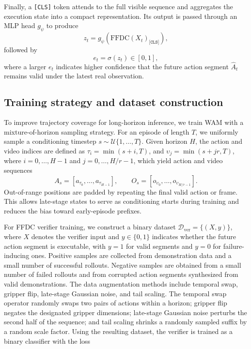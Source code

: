 \documentclass{article}
\begin{document}
Finally, a \texttt{[CLS]} token attends to the full visible sequence and aggregates the execution state into a compact representation. Its output is passed through an MLP head \(g_{\psi}\) to produce
\begin{equation}
z_t = g_{\psi}\!\left(\mathrm{FFDC}(X_t)_{\texttt{[CLS]}}\right),
\end{equation}
followed by
\begin{equation}
e_t = \sigma(z_t) \in [0,1],
\end{equation}
where a larger \(e_t\) indicates higher confidence that the future action segment \(\hat{A}_t\) remains valid under the latest real observation.

\subsection{Training strategy and dataset construction}
\label{sec:training strategy}
To improve trajectory coverage for long-horizon inference, we train WAM with a mixture-of-horizon sampling strategy. For an episode of length \(T\), we uniformly sample a conditioning timestep \(s \sim \mathcal{U}\{1,\dots,T\}\). Given horizon \(H\), the action and video indices are defined as \(\tau_i=\min(s+i,T)\), and \(\upsilon_j=\min(s+jr,T)\), where \(i=0,\dots,H-1\) and \(j=0,\dots,H/r-1\), which yield action and video sequences
\begin{equation}
A_s=[a_{\tau_0},\dots,a_{\tau_{H-1}}], \qquad
O_s=[o_{\upsilon_0},\dots,o_{\upsilon_{H/r-1}}].
\end{equation}
Out-of-range positions are padded by repeating the final valid action or frame. This allows late-stage states to serve as conditioning starts during training and reduces the bias toward early-episode prefixes.

For FFDC verifier training, we construct a binary dataset \(\mathcal{D}_{\mathrm{ver}}=\{(X,y)\}\), where \(X\) denotes the verifier input and \(y \in \{0,1\}\) indicates whether the future action segment is executable, with \(y=1\) for valid segments and \(y=0\) for failure-inducing ones. Positive samples are collected from demonstration data and a small number of successful rollouts. Negative samples are obtained from a small number of failed rollouts and from corrupted action segments synthesized from valid demonstrations. The data augmentation methods include temporal swap, gripper flip, late-stage Gaussian noise, and tail scaling. The temporal swap operator randomly swaps two pairs of actions within a horizon; gripper flip negates the designated gripper dimensions; late-stage Gaussian noise perturbs the second half of the sequence; and tail scaling shrinks a randomly sampled suffix by a random scale factor. Using the resulting dataset, the verifier is trained as a binary classifier with the loss
\end{document}
